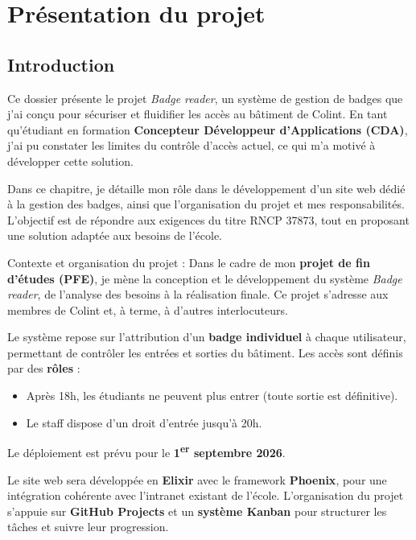\chapter{Présentation du projet}

\section{Introduction}
Ce dossier présente le projet \textit{Badge reader}, un système de gestion de badges que j’ai conçu pour sécuriser et fluidifier les accès au bâtiment de Colint. En tant qu’étudiant en formation \textbf{Concepteur Développeur d’Applications (CDA)}, j’ai pu constater les limites du contrôle d’accès actuel, ce qui m’a motivé à développer cette solution.

Dans ce chapitre, je détaille mon rôle dans le développement d’un site web dédié à la gestion des badges, ainsi que l’organisation du projet et mes responsabilités. L’objectif est de répondre aux exigences du titre RNCP 37873, tout en proposant une solution adaptée aux besoins de l’école.
\newline

\begin{for_you}{Contexte et organisation du projet :}
    Dans le cadre de mon \textbf{projet de fin d’études (PFE)}, je mène la conception et le développement du système \textit{Badge reader}, de l’analyse des besoins à la réalisation finale. Ce projet s’adresse aux membres de Colint et, à terme, à d’autres interlocuteurs.
    \newline

    Le système repose sur l’attribution d’un \textbf{badge individuel} à chaque utilisateur, permettant de contrôler les entrées et sorties du bâtiment. Les accès sont définis par des \textbf{rôles} :
    \begin{itemize}
        \item Après 18h, les étudiants ne peuvent plus entrer (toute sortie est définitive).
        \item Le staff dispose d’un droit d’entrée jusqu’à 20h.
        \newline
    \end{itemize}
    
    Le déploiement est prévu pour le \textbf{1\textsuperscript{er} septembre 2026}.

    Le site web sera développée en \textbf{Elixir} avec le framework \textbf{Phoenix}, pour une intégration cohérente avec l’intranet existant de l’école. L’organisation du projet s’appuie sur \textbf{GitHub Projects} et un \textbf{système Kanban} pour structurer les tâches et suivre leur progression.
\end{for_you}

